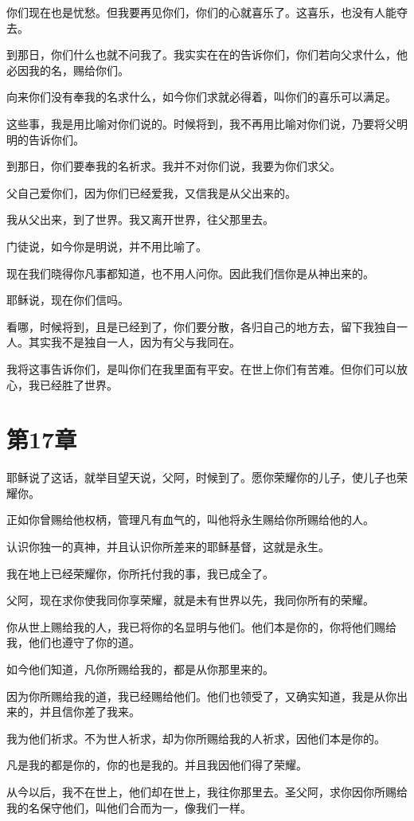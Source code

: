 \documentclass[12pt,oneside]{book}
\begin{document}
你们现在也是忧愁。但我要再见你们，你们的心就喜乐了。这喜乐，也没有人能夺去。

到那日，你们什么也就不问我了。我实实在在的告诉你们，你们若向父求什么，他必因我的名，赐给你们。

向来你们没有奉我的名求什么，如今你们求就必得着，叫你们的喜乐可以满足。

这些事，我是用比喻对你们说的。时候将到，我不再用比喻对你们说，乃要将父明明的告诉你们。

到那日，你们要奉我的名祈求。我并不对你们说，我要为你们求父。

父自己爱你们，因为你们已经爱我，又信我是从父出来的。

我从父出来，到了世界。我又离开世界，往父那里去。

门徒说，如今你是明说，并不用比喻了。

现在我们晓得你凡事都知道，也不用人问你。因此我们信你是从神出来的。

耶稣说，现在你们信吗。

看哪，时候将到，且是已经到了，你们要分散，各归自己的地方去，留下我独自一人。其实我不是独自一人，因为有父与我同在。

我将这事告诉你们，是叫你们在我里面有平安。在世上你们有苦难。但你们可以放心，我已经胜了世界。

\chapter{第17章}
耶稣说了这话，就举目望天说，父阿，时候到了。愿你荣耀你的儿子，使儿子也荣耀你。

正如你曾赐给他权柄，管理凡有血气的，叫他将永生赐给你所赐给他的人。

认识你独一的真神，并且认识你所差来的耶稣基督，这就是永生。

我在地上已经荣耀你，你所托付我的事，我已成全了。

父阿，现在求你使我同你享荣耀，就是未有世界以先，我同你所有的荣耀。

你从世上赐给我的人，我已将你的名显明与他们。他们本是你的，你将他们赐给我，他们也遵守了你的道。

如今他们知道，凡你所赐给我的，都是从你那里来的。

因为你所赐给我的道，我已经赐给他们。他们也领受了，又确实知道，我是从你出来的，并且信你差了我来。

我为他们祈求。不为世人祈求，却为你所赐给我的人祈求，因他们本是你的。

凡是我的都是你的，你的也是我的。并且我因他们得了荣耀。

从今以后，我不在世上，他们却在世上，我往你那里去。圣父阿，求你因你所赐给我的名保守他们，叫他们合而为一，像我们一样。
\end{document}
